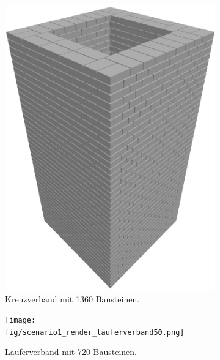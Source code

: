 \begin{figure}[htb]
    \hspace*{\fill}%
    \begin{subfigure}[b]{0.27\columnwidth}
      \includegraphics[width=\columnwidth]{fig/scenario1_render_crossbond.png}
      \caption{Kreuzverband mit 1360 Bausteinen.}\label{fig:poc:render_crossbond}
    \end{subfigure}
    \hfill
    \begin{subfigure}[b]{0.27\columnwidth}
      \texttt{[image: fig/scenario1\_render\_läuferverband50.png]}
      \caption{Läuferverband mit 720 Bausteinen.}\label{fig:poc:render_laeuferverband50}
    \end{subfigure}
    \hfill
    \begin{subfigure}[b]{0.27\columnwidth}

\end{subfigure}
\end{figure}
